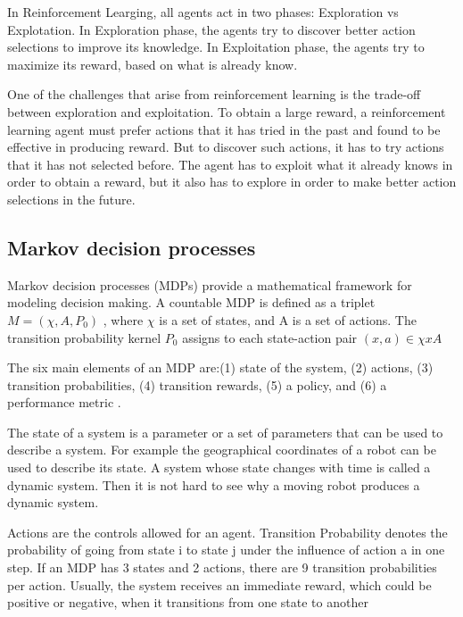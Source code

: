 \documentclass{bmcart}
\begin{document}
In Reinforcement Learging, all agents act in two phases: Exploration vs Explotation. In Exploration phase, the agents try to discover better action selections to improve its knowledge. In Exploitation phase, the agents try to maximize its reward, based on what is already know.

One of the challenges that arise from reinforcement learning is the trade-off between exploration and exploitation. To obtain a large reward, a reinforcement learning
agent must prefer actions that it has tried in the past and found to be effective in producing reward.
But to discover such actions, it has to try actions that it has not selected before. The agent has to exploit what it already knows in order to obtain a reward, but it also has to explore in order to make better action selections in the future.





\subsection{Markov decision processes}

Markov decision processes (MDPs) provide a mathematical framework for modeling decision making. A countable MDP is defined as a triplet $M=(\chi,A,P_{0})$ \citep{Szepesvari2010}, where $\chi$ is a set of states, and A is a set of actions. The transition probability kernel $P_{0}$ assigns to each state-action pair $(x, a) \in \chi x A $


The six main elements of an MDP are:(1) state of the system, (2) actions, (3) transition probabilities, (4) transition rewards, (5) a policy, and (6) a performance metric \citep{Sutton2012}.





The state of a system is a parameter or a set of parameters that can be used to describe a system. For example the geographical coordinates of a robot can be used to
describe its state. A system whose state changes with time is called a dynamic system. Then it is not hard to see why a moving robot produces a dynamic system.

Actions are the controls allowed for an agent. Transition Probability denotes the probability of going from state i to state j under the influence of action a in one step. If an MDP has 3 states and 2 actions, there are 9 transition probabilities per action. Usually, the system receives an immediate reward, which could be positive or negative, when it transitions from one state to another
\end{document}
